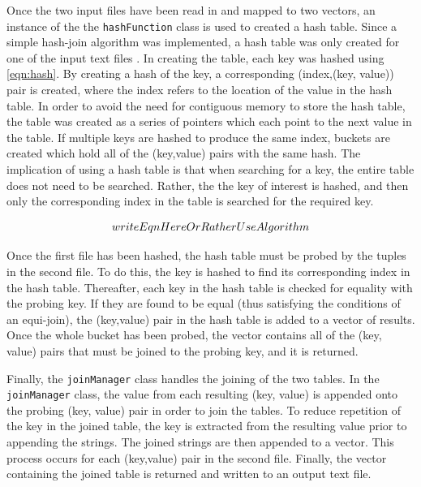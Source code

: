 \documentclass[10pt,twocolumn]{witseiepaper}
\begin{document}
Once the two input files have been read in and mapped to two vectors, an instance of the the \texttt{hashFunction} class is used to created a hash table. Since a simple hash-join algorithm was implemented, a hash table was only created for one of the input text files \cite{evaluating4JoinAlgorithms}. In creating the table, each key was hashed using \ref{eqn:hash}. By creating a hash of the key, a corresponding (index,(key, value)) pair is created, where the index refers to the location of the value in the hash table. In order to avoid the need for contiguous memory to store the hash table, the table was created as a series of pointers which each point to the next value in the table. If multiple keys are hashed to produce the same index, buckets are created which hold all of the (key,value) pairs with the same hash. The implication of using a hash table is that when searching for a key, the entire table does not need to be searched. Rather, the the key of interest is hashed, and then only the corresponding index in the table is searched for the required key.

\begin{equation}
 writeEqnHereOrRatherUseAlgorithm\\
\label{eqn:hash}
\end{equation}

Once the first file has been hashed, the hash table must be probed by the tuples in the second file. To do this, the key is hashed to find its corresponding index in the hash table. Thereafter, each key in the hash table is checked for equality with the probing key. If they are found to be equal (thus satisfying the conditions of an equi-join), the (key,value) pair in the hash table is added to a vector of results. Once the whole bucket has been probed, the vector contains all of the (key, value) pairs that must be joined to the probing key, and it is returned.

Finally, the \texttt{joinManager} class handles the joining of the two tables. In the \texttt{joinManager} class, the value from each resulting (key, value) is appended onto the probing (key, value) pair in order to join the tables. To reduce repetition of the key in the joined table, the key is extracted from the resulting value prior to appending the strings. The joined strings are then appended to a vector. This process occurs for each (key,value) pair in the second file. Finally, the vector containing the joined table is returned and written to an output text file.
\end{document}
